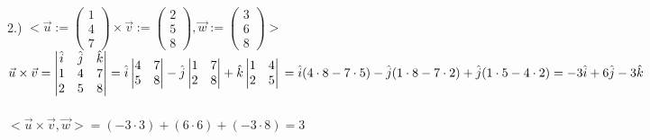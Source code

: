 \documentclass{article}
\begin{document}
\begin{enumerate}[c.]
\\
 2.)
 $<\vec{u}:=\left(\!
    \begin{array}{c}
      1 \\
      4 \\
      7
    \end{array}
  \!\right)\times\vec{v}:=\left(\!
    \begin{array}{c}
      2 \\
      5 \\
      8
    \end{array}
  \!\right),\vec{w}:=\left(\!
    \begin{array}{c}
      3 \\
      6 \\
      8
    \end{array}
  \!\right)>$\\ 
$\vec{u}\times\vec{v}=\begin{vmatrix}
\hat{i}&\hat{j}&\hat{k}\\
1&4&7\\
2&5&8\\
\end{vmatrix}=\hat{i}\begin{vmatrix}
4&7\\
5&8\\
\end{vmatrix}-\hat{j}\begin{vmatrix}
1&7\\
2&8\\
\end{vmatrix}+\hat{k}\begin{vmatrix}
1&4\\
2&5\\
\end{vmatrix}\\ = \hat{i}(4 \cdot 8-7 \cdot5)-\hat{j}(1\cdot8-7\cdot2)+\hat{j}(1\cdot5-4\cdot2)\\=-3\hat{i}+6\hat{j}-3\hat{k}$\\
\\
$<\vec{u}\times\vec{v},\vec{w}>=(-3\cdot3)+(6\cdot6)+(-3\cdot8)=3 $\\
\end{enumerate}
\end{document}

